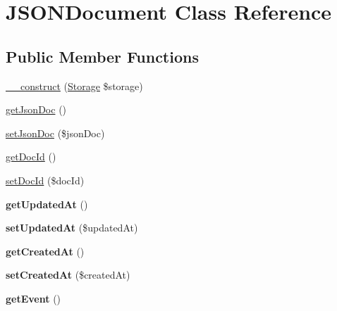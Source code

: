 \hypertarget{class_j_s_o_n_document}{\section{J\+S\+O\+N\+Document Class Reference}
\label{class_j_s_o_n_document}
}
\subsection*{Public Member Functions}
\begin{DoxyCompactItemize}
\item 
\hyperlink{class_j_s_o_n_document_afb738068014212d513d98072b6cc6934}{\+\_\+\+\_\+construct} (\hyperlink{class_storage}{Storage} \$storage)
\item 
\hyperlink{class_j_s_o_n_document_aae5b452f6f5fd02ada80f134039354e3}{get\+Json\+Doc} ()
\item 
\hyperlink{class_j_s_o_n_document_a1f08feb6a944164520c4929531ca57b9}{set\+Json\+Doc} (\$json\+Doc)
\item 
\hyperlink{class_j_s_o_n_document_a87d709928426d7537de30a368b3cf4ab}{get\+Doc\+Id} ()
\item 
\hyperlink{class_j_s_o_n_document_a717889281baa3c165b58e34efce28fdb}{set\+Doc\+Id} (\$doc\+Id)
\item 
\hypertarget{class_j_s_o_n_document_a789bc1a92b41cf8c0958231bc1f27131}{{\bfseries get\+Updated\+At} ()}\label{class_j_s_o_n_document_a789bc1a92b41cf8c0958231bc1f27131}

\item 
\hypertarget{class_j_s_o_n_document_a154a3aa07459e180aee80106b8060cbd}{{\bfseries set\+Updated\+At} (\$updated\+At)}\label{class_j_s_o_n_document_a154a3aa07459e180aee80106b8060cbd}

\item 
\hypertarget{class_j_s_o_n_document_a0f0455d4aafe27d1b0720c3bcfff2847}{{\bfseries get\+Created\+At} ()}\label{class_j_s_o_n_document_a0f0455d4aafe27d1b0720c3bcfff2847}

\item 
\hypertarget{class_j_s_o_n_document_aab2c0066b72ff0696fde86c1d5b74538}{{\bfseries set\+Created\+At} (\$created\+At)}\label{class_j_s_o_n_document_aab2c0066b72ff0696fde86c1d5b74538}

\item 
\hypertarget{class_j_s_o_n_document_a055bcb2a2b197f7d31e1dd99d9eb62f7}{{\bfseries get\+Event} ()}\label{class_j_s_o_n_document_a055bcb2a2b197f7d31e1dd99d9eb62f7}


\end{DoxyCompactItemize}
